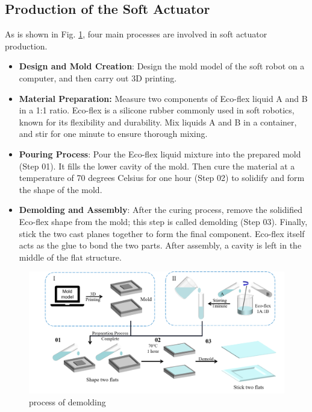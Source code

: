 \documentclass[10pt, a4paper, twocolumn]{article}
\begin{document}
\subsection{Production of the Soft Actuator}
As is shown in Fig. \ref{fig:demolding_assembly}, four main processes are involved in soft actuator production.
\begin{itemize}
    \item \textbf{Design and Mold Creation}: Design the mold model of the soft robot on a computer, and then carry out 3D printing.
    \item \textbf{Material Preparation:} Measure two components of Eco-flex liquid A and B in a 1:1 ratio. Eco-flex is a silicone rubber commonly used in soft robotics, known for its flexibility and durability. Mix liquids A and B in a container, and stir for one minute to ensure thorough mixing.
    \item \textbf{Pouring Process}: Pour the Eco-flex liquid mixture into the prepared mold (Step 01). It fills the lower cavity of the mold. Then cure the material at a temperature of 70 degrees Celsius for one hour (Step 02) to solidify and form the shape of the mold.
    \item \textbf{Demolding and Assembly}: After the curing process, remove the solidified Eco-flex shape from the mold; this step is called demolding (Step 03). Finally, stick the two cast planes together to form the final component. Eco-flex itself acts as the glue to bond the two parts. After assembly, a cavity is left in the middle of the flat structure.
\end{itemize}

\begin{figure}
    \centering
    \includegraphics[width=\linewidth]{demolding and assembly.png}
    \caption{process of demolding}
    \label{fig:demolding_assembly}
\end{figure}
\end{document}
